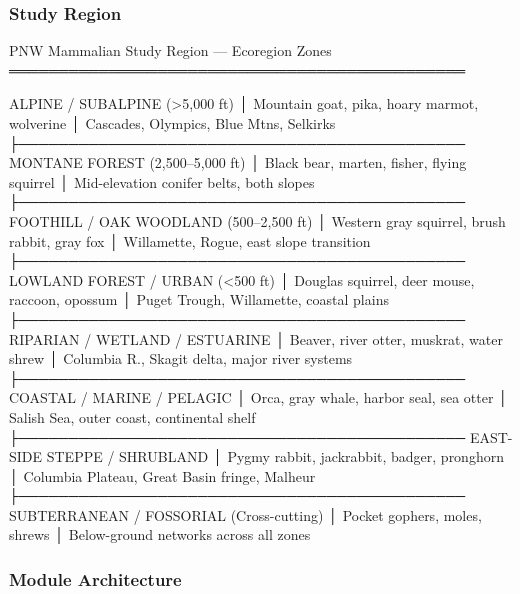 \documentclass[11pt,letterpaper]{article}
\begin{document}
\subsubsection{Study Region}

\begin{asciibox}
PNW Mammalian Study Region — Ecoregion Zones
══════════════════════════════════════════════

ALPINE / SUBALPINE (>5,000 ft)
│ Mountain goat, pika, hoary marmot, wolverine
│ Cascades, Olympics, Blue Mtns, Selkirks
├─────────────────────────────────────────────
MONTANE FOREST (2,500–5,000 ft)
│ Black bear, marten, fisher, flying squirrel
│ Mid-elevation conifer belts, both slopes
├─────────────────────────────────────────────
FOOTHILL / OAK WOODLAND (500–2,500 ft)
│ Western gray squirrel, brush rabbit, gray fox
│ Willamette, Rogue, east slope transition
├─────────────────────────────────────────────
LOWLAND FOREST / URBAN (<500 ft)
│ Douglas squirrel, deer mouse, raccoon, opossum
│ Puget Trough, Willamette, coastal plains
├─────────────────────────────────────────────
RIPARIAN / WETLAND / ESTUARINE
│ Beaver, river otter, muskrat, water shrew
│ Columbia R., Skagit delta, major river systems
├─────────────────────────────────────────────
COASTAL / MARINE / PELAGIC
│ Orca, gray whale, harbor seal, sea otter
│ Salish Sea, outer coast, continental shelf
├─────────────────────────────────────────────
EAST-SIDE STEPPE / SHRUBLAND
│ Pygmy rabbit, jackrabbit, badger, pronghorn
│ Columbia Plateau, Great Basin fringe, Malheur
├─────────────────────────────────────────────
SUBTERRANEAN / FOSSORIAL (Cross-cutting)
│ Pocket gophers, moles, shrews
│ Below-ground networks across all zones
\end{asciibox}

\subsubsection{Module Architecture}
\end{document}
